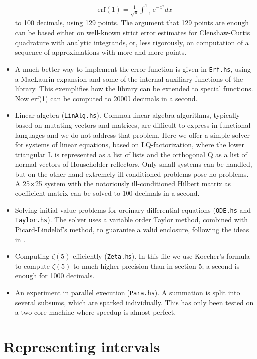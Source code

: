 \documentclass[9pt, a4, twocolumn]{article}
\begin{document}
\begin{itemize}
\begin{align*}
  \textrm{erf}(1) = \frac{1}{\sqrt{\pi}}\int_{-1}^{1} \textrm{e}^{-x^2} dx
\end{align*}
to 100 decimals, using 129 points. The argument that 129 points are
enough can be based either on well-known strict error estimates for
Clenshaw-Curtis quadrature with analytic integrands, or, less
rigorously, on computation of a sequence of approximations with more
and more points.
\item A much better way to implement the error function is given in
  \texttt{Erf.hs}, using a MacLaurin expansion and some of the
  internal auxiliary functions of the library. This exemplifies
  how the library can be extended to special functions. Now erf(1) can be
  computed to 20000 decimals in a second.
\item Linear algebra (\texttt{LinAlg.hs}). Common linear algebra
 algorithms, typically based on mutating vectors and matrices, are
difficult to express in functional languages and we do not address
that problem. Here we offer a simple 
solver for systems of linear equations, based on LQ-factorization,
where the lower triangular L is represented as a list of lists and the
orthogonal
Q as a list of normal vectors of Householder reflectors. Only small
systems 
can be handled, but on the other hand extremely ill-conditioned  
problems pose no problems. A 25$\times$25 system with the notoriously
ill-conditioned Hilbert matrix as coefficient matrix can be solved to 
100 decimals in a second. 
\item Solving initial value problems for ordinary differential
  equations (\texttt{ODE.hs} and \texttt{Taylor.hs}). The solver uses a variable order
Taylor method, combined with Picard-Lindel\"of's
method, to guarantee a valid enclosure, following the ideas in \cite{Tucker}.
\item Computing $\zeta(5)$ efficiently (\texttt{Zeta.hs}). In this file 
we use Koecher's formula to compute  $\zeta(5)$ to much higher
precision than in section 5; a second is enough for 1000 decimals.
\item An experiment in parallel execution (\texttt{Para.hs}). A
  summation is split into several subsums, which are sparked
  individually.
This has only been tested on a two-core machine where speedup is almost perfect.
\end{itemize}

\section{Representing intervals}
\end{document}
